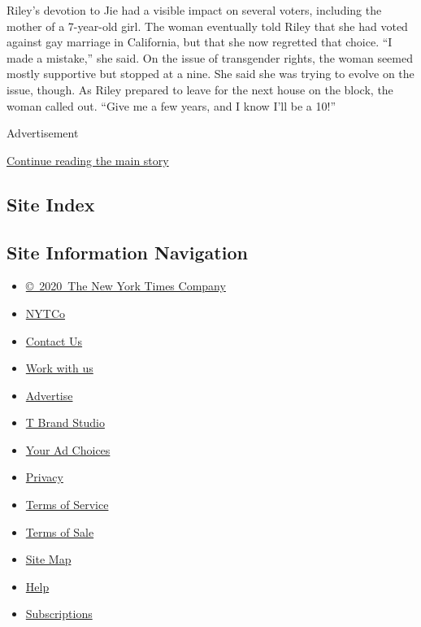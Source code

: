 Riley's devotion to Jie had a visible impact on several voters,
including the mother of a 7-year-old girl. The woman eventually told
Riley that she had voted against gay marriage in California, but that
she now regretted that choice. ``I made a mistake,'' she said. On the
issue of transgender rights, the woman seemed mostly supportive but
stopped at a nine. She said she was trying to evolve on the issue,
though. As Riley prepared to leave for the next house on the block, the
woman called out. ``Give me a few years, and I know I'll be a 10!''

Advertisement

\protect\hyperlink{after-bottom}{Continue reading the main story}

\hypertarget{site-index}{%
\subsection{Site Index}\label{site-index}}

\hypertarget{site-information-navigation}{%
\subsection{Site Information
Navigation}\label{site-information-navigation}}

\begin{itemize}
\tightlist
\item
  \href{https://help.nytimes3xbfgragh.onion/hc/en-us/articles/115014792127-Copyright-notice}{©~2020~The
  New York Times Company}
\end{itemize}

\begin{itemize}
\tightlist
\item
  \href{https://www.nytco.com/}{NYTCo}
\item
  \href{https://help.nytimes3xbfgragh.onion/hc/en-us/articles/115015385887-Contact-Us}{Contact
  Us}
\item
  \href{https://www.nytco.com/careers/}{Work with us}
\item
  \href{https://nytmediakit.com/}{Advertise}
\item
  \href{http://www.tbrandstudio.com/}{T Brand Studio}
\item
  \href{https://www.nytimes3xbfgragh.onion/privacy/cookie-policy\#how-do-i-manage-trackers}{Your
  Ad Choices}
\item
  \href{https://www.nytimes3xbfgragh.onion/privacy}{Privacy}
\item
  \href{https://help.nytimes3xbfgragh.onion/hc/en-us/articles/115014893428-Terms-of-service}{Terms
  of Service}
\item
  \href{https://help.nytimes3xbfgragh.onion/hc/en-us/articles/115014893968-Terms-of-sale}{Terms
  of Sale}
\item
  \href{https://spiderbites.nytimes3xbfgragh.onion}{Site Map}
\item
  \href{https://help.nytimes3xbfgragh.onion/hc/en-us}{Help}
\item
  \href{https://www.nytimes3xbfgragh.onion/subscription?campaignId=37WXW}{Subscriptions}
\end{itemize}
